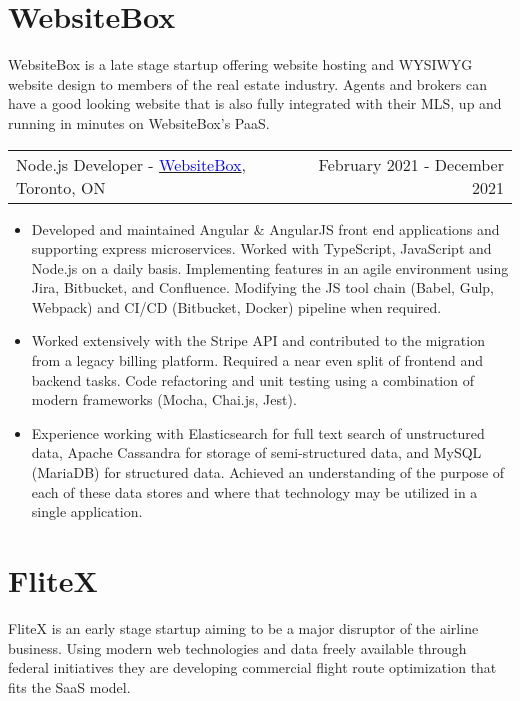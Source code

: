 \documentclass[margin]{res}
\begin{document}
\begin{resume}
	\normalsize{\section{WebsiteBox}}

	WebsiteBox is a late stage startup offering website hosting and WYSIWYG
	website design to members of the real estate industry. Agents and brokers
	can have a good looking website that is also fully integrated with their
	MLS, up and running in minutes on WebsiteBox's PaaS.

	\begin{tabular}{p{3in} r} %
		Node.js Developer - \href{https://websitebox.com}{\textcolor{blue}{WebsiteBox}}, Toronto, ON & February 2021 - December 2021
	\end{tabular}

	\begin{itemize} %
		\item Developed and maintained Angular \& AngularJS front end applications and supporting
		      express microservices. Worked with TypeScript, JavaScript and Node.js on a daily basis.
		      Implementing features in an agile environment using Jira, Bitbucket, and Confluence.
		      Modifying the JS tool chain (Babel, Gulp, Webpack) and CI/CD (Bitbucket, Docker) pipeline
		      when required.
		\item Worked extensively with the Stripe API and contributed to the migration from a legacy
		      billing platform. Required a near even split of frontend and backend
		      tasks. Code refactoring and unit testing using a combination of modern frameworks
		      (Mocha, Chai.js, Jest).
		\item Experience working with Elasticsearch for full text search of unstructured data,
		      Apache Cassandra for storage of semi-structured data, and MySQL (MariaDB) for structured data.
		      Achieved an understanding of the purpose of each of these data stores and where that technology may be
		      utilized in a single application.
	\end{itemize}

	\normalsize{\section{FliteX}}

	FliteX is an early stage startup aiming to be a major disruptor of the airline business. Using modern
	web technologies and data freely available through federal initiatives they are developing commercial
	flight route optimization that fits the SaaS model.


\end{resume}
\end{document}
